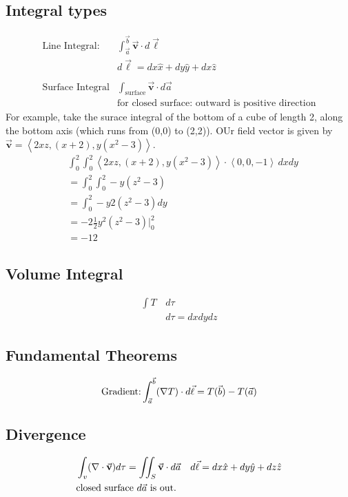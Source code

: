 \documentclass[10pt,oneside]{book}
\newcommand{\gspc}{\vspace{0.13cm}} %
\newcommand{\gline}[0]{\gspc\\} %
\newcommand{\vv}{\vec{\mathbf{v}}}
\newcommand{\pvec}[1]{\left\langle#1\right\rangle}
\begin{document}
\subsection*{Integral types}
\begin{align*}
  \text{Line Integral: }&\int_{\vec a}^{\vec b}\vv \cdot d\vec \ell\\
  &d\vec\ell = dx\hat x + dy \hat y + dx\hat z\\\\
  \text{Surface Integral}&\int_\text{surface}\vv \cdot d\vec a\\
  &\text{for closed surface: outward is positive direction}
\end{align*}
For example, take the surace integral of the bottom of a cube of length 2, along the bottom axis (which runs from (0,0) to (2,2)). OUr field vector is given by $\vv =\pvec{2xz, (x+2), y(x^2-3)}$. \gline{}
\begin{align*}
  &\int_0^2\int_0^2 \pvec{2xz, (x+2), y(x^2-3)}\cdot \pvec{0, 0, -1}\,dxdy\\
  &= \int_0^2\int_0^2 -y(z^2 - 3)\\
  &= \int_0^2 -y2(z^2 - 3) dy\\
  &= -2\frac{1}2y^2(z^2 - 3)\Big|_0^2\\
  &= -12
\end{align*}
\subsection*{Volume Integral}
\begin{align*}
  \int T \,&d\tau\\
  &d\tau=dxdydz
\end{align*}
\subsection*{Fundamental Theorems}
\begin{align*}
  \text{Gradient:} \int_{\vec a}^{\vec b}(\nabla T)\cdot d\vec\ell = T(\vec b) - T(\vec a)
\end{align*}
\subsection*{Divergence}
\begin{align*}
  &\int_v (\del\cdot \vv)d\tau = \iint_S \vv\cdot d\vec a &d\vec\ell= dx\hat x + dy\hat y +dz\hat z\\
  &\text{closed surface }d\vec a \text{ is out.}
\end{align*}
\end{document}
